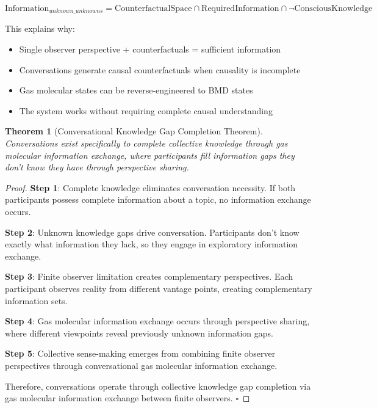 \documentclass[11pt,a4paper]{article}
\newtheorem{theorem}{Theorem}[section]
\begin{document}
\begin{equation}
\text{Information}_{unknown\_unknowns} = \text{CounterfactualSpace} \cap \text{RequiredInformation} \cap \neg\text{ConsciousKnowledge}
\end{equation}

This explains why:
\begin{itemize}
\item Single observer perspective + counterfactuals = sufficient information
\item Conversations generate causal counterfactuals when causality is incomplete
\item Gas molecular states can be reverse-engineered to BMD states
\item The system works without requiring complete causal understanding
\end{itemize}

\begin{theorem}[Conversational Knowledge Gap Completion Theorem]
Conversations exist specifically to complete collective knowledge through gas molecular information exchange, where participants fill information gaps they don't know they have through perspective sharing.
\end{theorem}

\begin{proof}
\textbf{Step 1}: Complete knowledge eliminates conversation necessity. If both participants possess complete information about a topic, no information exchange occurs.

\textbf{Step 2}: Unknown knowledge gaps drive conversation. Participants don't know exactly what information they lack, so they engage in exploratory information exchange.

\textbf{Step 3}: Finite observer limitation creates complementary perspectives. Each participant observes reality from different vantage points, creating complementary information sets.

\textbf{Step 4}: Gas molecular information exchange occurs through perspective sharing, where different viewpoints reveal previously unknown information gaps.

\textbf{Step 5}: Collective sense-making emerges from combining finite observer perspectives through conversational gas molecular information exchange.

Therefore, conversations operate through collective knowledge gap completion via gas molecular information exchange between finite observers. $\square$
\end{proof}
\end{document}

